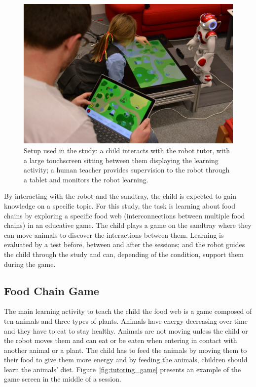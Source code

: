 \begin{figure}[ht]
	\centering
	\includegraphics[width=1\textwidth]{setup.jpg}
	\caption{Setup used in the study: a child interacts with the robot tutor, with a large touchscreen sitting between them displaying the learning activity; a human teacher provides supervision to the robot through a tablet and monitors the robot learning.}
	\label{fig:tutoring_setup}
\end{figure}

By interacting with the robot and the sandtray, the child is expected to gain knowledge on a specific topic. For this study, the task is learning about food chains by exploring a specific food web (interconnections between multiple food chains) in an educative game. The child plays a game on the sandtray where they can move animals to discover the interactions between them. Learning is evaluated by a test before, between and after the sessions; and the robot guides the child through the study and can, depending of the condition, support them during the game.

\subsection{Food Chain Game}

The main learning activity to teach the child the food web is a game composed of ten animals and three types of plants. Animals have energy decreasing over time and they have to eat to stay healthy. Animals are not moving unless the child or the robot moves them and can eat or be eaten when entering in contact with another animal or a plant. The child has to feed the animals by moving them to their food to give them more energy and by feeding the animals, children should learn the animals' diet. Figure~\ref{fig:tutoring_game} presents an example of the game screen in the middle of a session.

